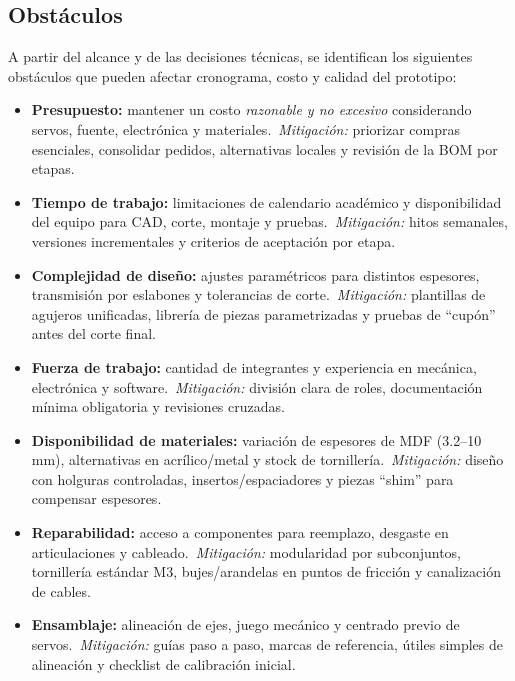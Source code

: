 \subsection{Obstáculos}
A partir del alcance y de las decisiones técnicas, se identifican los siguientes obstáculos que pueden afectar cronograma, costo y calidad del prototipo:

\begin{itemize}
  \item \textbf{Presupuesto:} mantener un costo \emph{razonable y no excesivo} considerando servos, fuente, electrónica y materiales.\ \emph{Mitigación:} priorizar compras esenciales, consolidar pedidos, alternativas locales y revisión de la BOM por etapas.
  
  \item \textbf{Tiempo de trabajo:} limitaciones de calendario académico y disponibilidad del equipo para CAD, corte, montaje y pruebas.\ \emph{Mitigación:} hitos semanales, versiones incrementales y criterios de aceptación por etapa.
  
  \item \textbf{Complejidad de diseño:} ajustes paramétricos para distintos espesores, transmisión por eslabones y tolerancias de corte.\ \emph{Mitigación:} plantillas de agujeros unificadas, librería de piezas parametrizadas y pruebas de “cupón” antes del corte final.
  
  \item \textbf{Fuerza de trabajo:} cantidad de integrantes y experiencia en mecánica, electrónica y software.\ \emph{Mitigación:} división clara de roles, documentación mínima obligatoria y revisiones cruzadas.
  
  \item \textbf{Disponibilidad de materiales:} variación de espesores de MDF (3.2--10\,mm), alternativas en acrílico/metal y stock de tornillería.\ \emph{Mitigación:} diseño con holguras controladas, insertos/espaciadores y piezas “shim” para compensar espesores.
  
  \item \textbf{Reparabilidad:} acceso a componentes para reemplazo, desgaste en articulaciones y cableado.\ \emph{Mitigación:} modularidad por subconjuntos, tornillería estándar M3, bujes/arandelas en puntos de fricción y canalización de cables.
  
  \item \textbf{Ensamblaje:} alineación de ejes, juego mecánico y centrado previo de servos.\ \emph{Mitigación:} guías paso a paso, marcas de referencia, útiles simples de alineación y checklist de calibración inicial.
\end{itemize}



